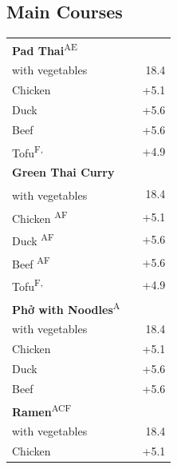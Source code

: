 \documentclass[a4paper,12pt]{article}
\newcommand{\vegan}{\textbf{\scriptsize \color{vegan}{Vegan}}}
\begin{document}
\begin{multicols}{2}
\section*{Main Courses}
\begin{tabular}{Lrr}
\textbf{Pad Thai}\textsuperscript{{\scriptsize AE}}\\
\hspace{0.4cm}with vegetables & & 18.4\\
\hspace{0.4cm}Chicken & & +5.1\\
\hspace{0.4cm}Duck & & +5.6\\
\hspace{0.4cm}Beef & & +5.6\\
\hspace{0.4cm}Tofu\textsuperscript{{\scriptsize F, \vegan}} & & +4.9\\
\textbf{Green Thai Curry}\\
\hspace{0.4cm}with vegetables\textsuperscript{\vegan} & & 18.4\\
\hspace{0.4cm}Chicken \textsuperscript{{\scriptsize AF}} & & +5.1\\
\hspace{0.4cm}Duck \textsuperscript{{\scriptsize AF}} & & +5.6\\
\hspace{0.4cm}Beef \textsuperscript{{\scriptsize AF}} & & +5.6\\
\hspace{0.4cm}Tofu\textsuperscript{{\scriptsize F, \vegan}} & & +4.9\\
\textbf{Phở with Noodles}\textsuperscript{{\scriptsize A}}\\
\hspace{0.4cm}with vegetables & & 18.4\\
\hspace{0.4cm}Chicken & & +5.1\\
\hspace{0.4cm}Duck & & +5.6\\
\hspace{0.4cm}Beef & & +5.6\\
\textbf{Ramen}\textsuperscript{{\scriptsize ACF}}\\
\hspace{0.4cm}with vegetables & & 18.4\\
\hspace{0.4cm}Chicken & & +5.1\\

\end{tabular}
\end{multicols}
\end{document}
